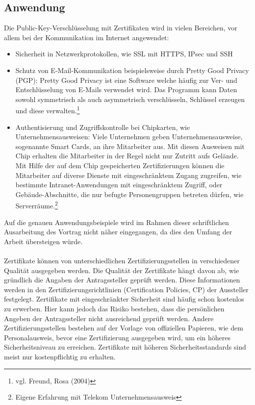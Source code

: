 \subsection{Anwendung}
Die Public-Key-Verschlüsselung mit Zertifikaten wird in vielen Bereichen, vor allem bei der Kommunikation im Internet angewendet:
\begin{itemize}
\item Sicherheit in Netzwerkprotokollen, wie SSL mit HTTPS, IPsec und SSH
\item Schutz von E-Mail-Kommunikation beispielsweise durch Pretty Good Privacy (PGP): Pretty Good Privacy ist eine Software welche häufig zur Ver- und Entschlüsselung von E-Mails verwendet wird. Das Programm kann Daten sowohl symmetrisch als auch asymmetrisch verschlüsseln, Schlüssel erzeugen und diese verwalten.\footnote{vgl. Freund, Rosa (2004)}
\item Authentisierung und Zugriffskontrolle bei Chipkarten, wie Unternehmensausweisen: Viele Unternehmen geben Unternehmensausweise, sogenannte Smart Cards, an ihre Mitarbeiter aus. Mit diesen Ausweisen mit Chip erhalten die Mitarbeiter in der Regel nicht nur Zutritt aufs Gelände. Mit Hilfe der auf dem Chip gespeicherten Zertifizierungen können die Mitarbeiter auf diverse Dienste mit eingeschränktem Zugang zugreifen, wie bestimmte Intranet-Anwendungen mit eingeschränktem Zugriff, oder Gebäude-Abschnitte, die nur befugte Personengruppen betreten dürfen, wie Serverräume.\footnote{Eigene Erfahrung mit Telekom Unternehmensausweis}
\end{itemize}
Auf die genauen Anwendungsbeispiele wird im Rahmen dieser schriftlichen Ausarbeitung des Vortrag nicht näher eingegangen, da dies den Umfang der Arbeit übersteigen würde.\\
\\
Zertifikate können von unterschiedlichen Zertifizierungsstellen in verschiedener Qualität ausgegeben werden. Die Qualität der Zertifikate hängt davon ab, wie gründlich die Angaben der Antragssteller geprüft werden. Diese Informationen werden in den Zertifizierungsrichtlinien (Certification Policies, CP) der Aussteller festgelegt. Zertifikate mit eingeschränkter Sicherheit sind häufig schon kostenlos zu erwerben. Hier kann jedoch das Risiko bestehen, dass die persönlichen Angeben der Antragssteller nicht ausreichend geprüft werden. Andere Zertifizierungsstellen bestehen auf der Vorlage von offiziellen Papieren, wie dem Personalausweis, bevor eine Zertifizierung ausgegeben wird, um ein höheres Sicherheitsniveau zu erreichen. Zertifikate mit höheren Sicherheitsstandards sind meist nur kostenpflichtig zu erhalten.\\
